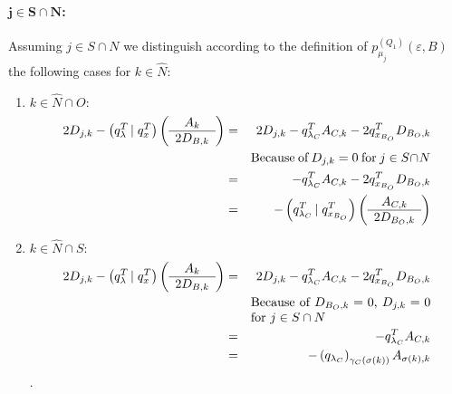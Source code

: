 \documentclass[a4paper]{article}
\newcommand{\pmu}[2]{\ensuremath{p_{\mu_{j}}^{(#1)}(\varepsilon, #2)}}
\begin{document}
\paragraph{$\mathbf{j \in S \cap N}$:}
Assuming $j \in S \cap N$ we distinguish according to the definition of
\pmu{Q_{1}}{B} the following cases for $k \in \hat{N}$:
\begin{enumerate}
\item $k \in \hat{N} \cap O:$
\begin{eqnarray}
\label{eq:r1_j_S_N_k_N_O}
    2D_{j,k}
    -\left(q_{\lambda}^{T} \left| \right. q_{x}^{T} \right)
    \left(\begin{array}{c}
            A_{k} \\
	    \hline
	    2D_{B, k}
	  \end{array}
    \right)
&=&
2D_{j,k} - q_{\lambda_{C}}^{T}A_{C, k} - 2q_{x_{B_{O}}}^{T}D_{B_{O},k}
\nonumber \\
&&\begin{minipage}{5cm}
Because of $D_{j,k}=0$ for $j \in S \cap N$
\end{minipage}
\nonumber \\
&=&
- q_{\lambda_{C}}^{T}A_{C, k} - 2q_{x_{B_{O}}}^{T}D_{B_{O},k}
\nonumber \\
&=&
-\left(q_{\lambda_{C}}^{T}\left|\right. q_{x_{B_{O}}}^{T}\right)
\left(\begin{array}{c}
        A_{C,k} \\
	\hline
	2D_{B_{O},k}
      \end{array}
\right)
\end{eqnarray}

\item $k \in \hat{N} \cap S:$
\begin{eqnarray}
\label{eq:r1_j_S_N_k_N_S}
    2D_{j,k}
    -\left(q_{\lambda}^{T} \left| \right. q_{x}^{T} \right)
    \left(\begin{array}{c}
            A_{k} \\
	    \hline
	    2D_{B, k}
	  \end{array}
    \right)
&=&
2D_{j,k} - q_{\lambda_{C}}^{T}A_{C, k} - 2q_{x_{B_{O}}}^{T}D_{B_{O},k}
\nonumber \\
&&\begin{minipage}{5cm}
Because of $D_{B_{O},k}=0$, $D_{j,k}=0$ for $j \in S \cap N$
\end{minipage}
\nonumber \\
&=&
-q_{\lambda_{C}}^{T}A_{C,k}
\nonumber \\
&=&
-\left(q_{\lambda_{C}}\right)_{\gamma_{C}(\sigma(k))}A_{\sigma(k),k}
\end{eqnarray}.
\end{enumerate}
\end{document}
